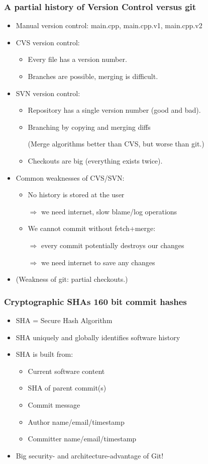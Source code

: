 \documentclass[ignoreframetext,envcountsect]{beamer}
\newif\ifsnop\snoptrue
\newcommand{\bi}{\begin{itemize}}
\newcommand{\ei}{\end{itemize}}
\newcommand{\cemph}[1]{{\color{red}#1}}
\begin{document}
\ifsnop
\begin{frame}
\frametitle{A partial history of Version Control versus git}
\bi
\item
  Manual version control: main.cpp, main.cpp.v1, main.cpp.v2
\item 
  CVS version control:
  \bi
  \item
    Every file has a version number.
  \item
    Branches are possible, merging is difficult.
  \ei
\item 
  SVN version control:
  \bi
  \item
    Repository has a single version number (good and bad).
  \item
    Branching by copying and merging diffs
     
    (Merge algorithms better than CVS, but worse than git.)
  \item
    Checkouts are big (everything exists twice).
  \ei
\item
  Common weaknesses of CVS/SVN:
  \bi
  \item
    No history is stored at the user

    $\Rightarrow$ we need internet, slow blame/log operations
  \item
    We cannot commit without fetch+merge:
    
    $\Rightarrow$ every commit potentially destroys our changes

    $\Rightarrow$ we need internet to save any changes
  \ei
\item
  (Weakness of git: partial checkouts.)
\ei
\end{frame}
\fi



\ifsnop
\begin{frame}
\frametitle{Cryptographic SHAs 160 bit commit hashes}
\bi
\item
  SHA = Secure Hash Algorithm
\item
  SHA \cemph{uniquely and globally} identifies software history
\item
  SHA is built from:
  \bi
  \item Current software content
  \item SHA of parent commit(s)
  \item Commit message
  \item Author name/email/timestamp
  \item Committer name/email/timestamp
  \ei
\item
  Big security- and architecture-advantage of Git!
\ei
\end{frame}
\fi
\end{document}
